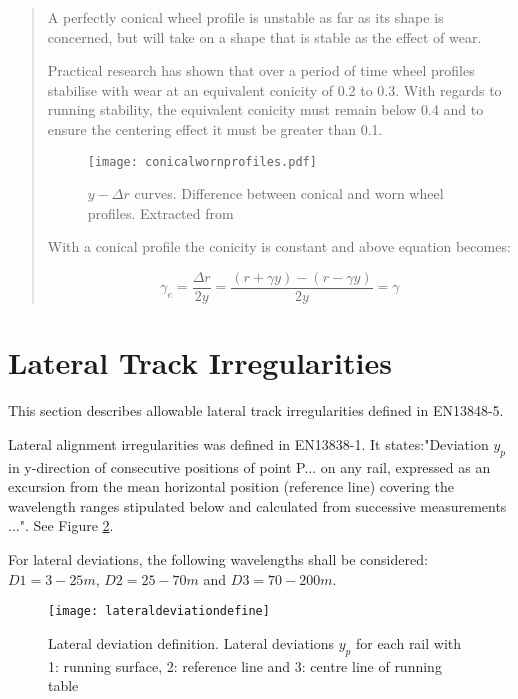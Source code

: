 \begin{quote}

A perfectly conical wheel profile is unstable as far as its shape is concerned, but will take on a shape that is stable as the effect of wear.

Practical research has shown that over a period of time wheel profiles stabilise with wear at an equivalent conicity of 0.2 to 0.3. With regards to running stability, the equivalent conicity must remain below 0.4 and to ensure the centering effect it must be greater than 0.1.

\begin{figure}[h]
    \centering
    \texttt{[image: conicalwornprofiles.pdf]}
    \caption{$y-\Delta r$ curves. Difference between conical and worn wheel profiles. Extracted from \citet[2.4]{esveld2001modern}}
    \label{fig:conicalwornprofiles}
\end{figure}

With a conical profile the conicity is constant and above equation becomes:

$$ \gamma_e = \frac{\Delta r}{2y} =\frac{(r+\gamma y)-(r-\gamma y)}{2y} = \gamma $$

\end{quote}

\section{Lateral Track Irregularities}\label{sec:lateraltrackirrgularities}

This section describes allowable lateral track irregularities defined in EN13848-5\citet{13848}. 

Lateral alignment irregularities was defined in EN13838-1. It states:"Deviation $y_p$ in y-direction of consecutive positions of point P... on any rail, expressed as an excursion from the mean horizontal position (reference line) covering the wavelength ranges stipulated below and calculated from successive measurements ...". See Figure \ref{fig:lateraldeviationdefine}.

For lateral deviations, the following wavelengths shall be considered: $D1 = 3 -25 m$, $D2 = 25 - 70 m$ and $D3 = 70 - 200 m$. 

\begin{figure}[h]
    \centering
    \texttt{[image: lateraldeviationdefine]}
    \caption{Lateral deviation definition. Lateral deviations $y_p$ for each rail with 1: running surface, 2: reference line and 3: centre line of running table}
    \label{fig:lateraldeviationdefine}
\end{figure}

